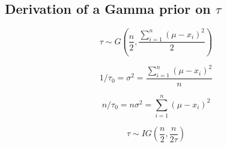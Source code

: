 \documentclass[12pt]{article}
\begin{document}
\begin{flushleft}
\begin{spacing}{1}
\section{Derivation of a Gamma prior on $\tau$}

$$\tau \sim G(\frac{n}{2}, \frac{\sum_{i=1}^{n}(\mu-x_i)^2}{2})$$

$$1/\tau_0=\sigma^2=\frac{\sum_{i=1}^{n}(\mu-x_i)^2}{n}$$

$$n/\tau_0=n\sigma^2=\sum_{i=1}^{n}(\mu-x_i)^2$$
  
$$\tau \sim IG(\frac{n}{2}, \frac{n}{2\tau})$$

\newpage

\end{spacing}
\end{flushleft}
\end{document}
